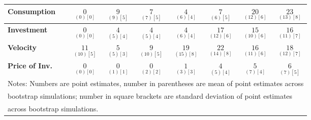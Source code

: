 \documentclass{article}
\begin{document}
\begin{tabular}{|l|c|@{}c|c|@{}c|c|@{}c|c|}
 \textbf{Consumption} & $\underset{(  0) [  0]}{  0}$ & $\underset{(  9) [  5]}{  9}$ & $\underset{(  7) [  5]}{  7}$ & $\underset{(  6) [  4]}{  4}$ & $\underset{(  6) [  5]}{  7}$ & $\underset{( 12) [  6]}{ 20}$ & $\underset{( 13) [  8]}{ 23}$ \\ \hline 
 \textbf{Investment} & $\underset{(  0) [  0]}{  0}$ & $\underset{(  5) [  4]}{  4}$ & $\underset{(  5) [  4]}{  4}$ & $\underset{(  6) [  4]}{  4}$ & $\underset{( 12) [  6]}{ 17}$ & $\underset{( 10) [  6]}{ 15}$ & $\underset{( 11) [  7]}{ 16}$ \\ \hline 
 \textbf{Velocity} & $\underset{( 10) [  5]}{ 11}$ & $\underset{(  5) [  3]}{  5}$ & $\underset{( 10) [  5]}{  9}$ & $\underset{( 15) [  8]}{ 19}$ & $\underset{( 14) [  8]}{ 22}$ & $\underset{( 11) [  6]}{ 16}$ & $\underset{( 12) [  7]}{ 18}$ \\ \hline 
 \textbf{Price of Inv.} & $\underset{(  0) [  0]}{  0}$ & $\underset{(  1) [  1]}{  0}$ & $\underset{(  2) [  2]}{  0}$ & $\underset{(  3) [  3]}{  1}$ & $\underset{(  5) [  4]}{  4}$ & $\underset{(  7) [  4]}{  5}$ & $\underset{(  7) [  5]}{  6}$ \\ \hline 
 \multicolumn{8}{|l|}{Notes: Numbers are point estimates, number in 
 parentheses are mean of point estimates across} \\ \hline 
 \multicolumn{8}{|l|}{bootstrap simulations; number in square brackets are 
 standard deviation of point estimates} \\ \hline 
 \multicolumn{8}{|l|}{across bootstrap simulations.} \\ \hline 
 \end{tabular} 
\end{document}
